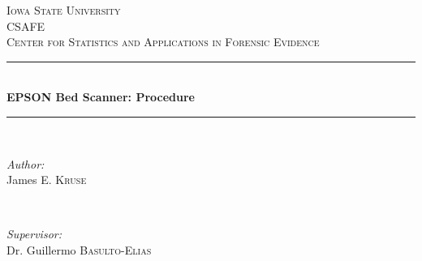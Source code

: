 \begin{titlepage}

\newcommand{\HRule}{\rule{\linewidth}{0.5mm}} %

\center %
 

\textsc{\LARGE Iowa State University}\\[1.5cm] %
\textsc{\Large CSAFE}\\[0.5cm] %
\textsc{\large Center for Statistics and Applications in Forensic Evidence }\\[0.5cm] %


\HRule \\[0.4cm]
{ \huge \bfseries EPSON Bed Scanner: Procedure }\\[0.4cm] %
\HRule \\[1.5cm]
 

\begin{minipage}{0.4\textwidth}
\begin{flushleft} \large
\emph{Author:}\\
James \textsc{E. Kruse} %
\end{flushleft}
\end{minipage}
~
\begin{minipage}{0.4\textwidth}
\begin{flushright} \large
\emph{Supervisor:} \\
Dr. Guillermo \textsc{Basulto-Elias} %
\end{flushright}
\end{minipage}\\[2cm]



\end{titlepage}
